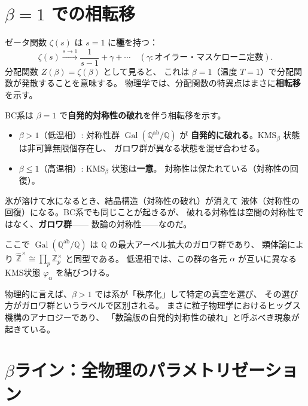 \documentclass[11pt,a4paper]{article}
\theoremstyle{definition}
\newcommand{\Z}{\mathbb{Z}}
\newcommand{\Q}{\mathbb{Q}}
\newcommand{\Gal}{\operatorname{Gal}}
\begin{document}
\section{$\beta = 1$ での相転移}
\label{sec:2.4}

ゼータ関数 $\zeta(s)$ は $s=1$ に\textbf{極}を持つ：
\[
  \zeta(s) \xrightarrow{s\to 1} \frac{1}{s-1} + \gamma + \cdots
  \quad (\gamma: \text{オイラー・マスケローニ定数}).
\]
分配関数 $Z(\beta) = \zeta(\beta)$ として見ると、
これは $\beta = 1$（温度 $T=1$）で分配関数が発散することを意味する。
物理学では、分配関数の特異点はまさに\textbf{相転移}を示す。

\begin{keybox}[$\beta = 1$ での相転移 (Bost--Connes)]
BC系は $\beta = 1$ で\textbf{自発的対称性の破れ}を伴う相転移を示す。
\begin{itemize}
  \item $\beta > 1$（低温相）: 対称性群 $\Gal(\Q^{\mathrm{ab}}/\Q)$ が
        \textbf{自発的に破れる}。KMS$_\beta$ 状態は非可算無限個存在し、
        ガロワ群が異なる状態を混ぜ合わせる。
  \item $\beta \leq 1$（高温相）: KMS$_\beta$ 状態は\textbf{一意}。
        対称性は保たれている（対称性の回復）。
\end{itemize}
\end{keybox}

\begin{hsbox}
氷が溶けて水になるとき、結晶構造（対称性の破れ）が消えて
液体（対称性の回復）になる。BC系でも同じことが起きるが、
破れる対称性は空間の対称性ではなく、\textbf{ガロワ群}——
数論の対称性——なのだ。
\end{hsbox}

ここで $\Gal(\Q^{\mathrm{ab}}/\Q)$ は $\Q$ の最大アーベル拡大のガロワ群であり、
類体論により $\hat{\Z}^{\times} \cong \prod_p \Z_p^{\times}$ と同型である。
低温相では、この群の各元 $\alpha$ が互いに異なるKMS状態 $\varphi_\alpha$ を結びつける。

物理的に言えば、$\beta > 1$ では系が「秩序化」して特定の真空を選び、
その選び方がガロワ群というラベルで区別される。
まさに粒子物理学におけるヒッグス機構のアナロジーであり、
「数論版の自発的対称性の破れ」と呼ぶべき現象が起きている。

\section{$\beta$ライン：全物理のパラメトリゼーション}
\label{sec:2.5}
\end{document}
